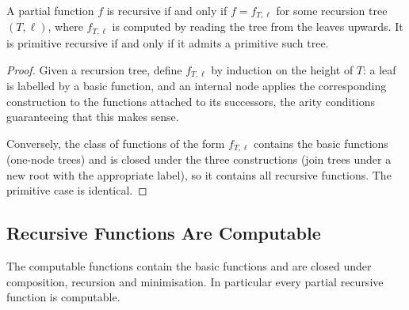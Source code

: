 \documentclass[a4paper]{scrartcl}
\begin{document}
\begin{theorem}
	A partial function $f$ is recursive if and only if $f = f_{T,\ell}$ for some recursion tree $(T,\ell)$, where $f_{T,\ell}$ is computed by reading the tree from the leaves upwards. It is primitive recursive if and only if it admits a primitive such tree.
\end{theorem}

\begin{proof}
	Given a recursion tree, define $f_{T,\ell}$ by induction on the height of $T$: a leaf is labelled by a basic function, and an internal node applies the corresponding construction to the functions attached to its successors, the arity conditions guaranteeing that this makes sense.

	Conversely, the class of functions of the form $f_{T,\ell}$ contains the basic functions (one-node trees) and is closed under the three constructions (join trees under a new root with the appropriate label), so it contains all recursive functions. The primitive case is identical.
\end{proof}

\subsection{Recursive Functions Are Computable}

\begin{theorem}\label{thm:recursivecomputable}
	The computable functions contain the basic functions and are closed under composition, recursion and minimisation. In particular every partial recursive function is computable.
\end{theorem}
\end{document}
